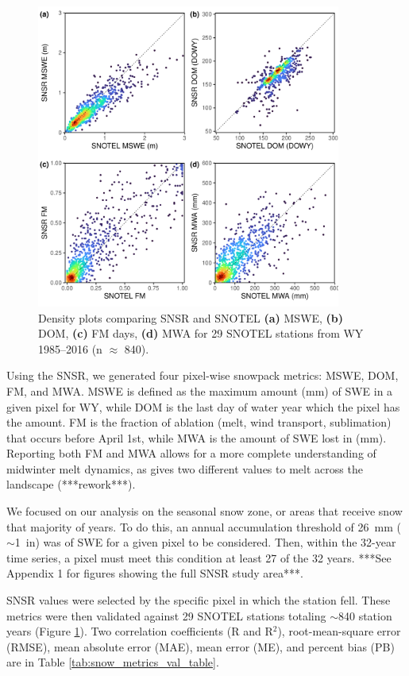 \begin{figure}[t]
\centering
\includegraphics[width=10cm]{figures/ch2_figs/snsr_snotel_metric_compare_new_v1.pdf}
\caption{Density plots comparing SNSR and SNOTEL \textbf{(a)} MSWE, \textbf{(b)} DOM, \textbf{(c)} FM days, \textbf{(d)} MWA for 29 SNOTEL stations from WY 1985--2016 (n $\approx$ 840).}
\label{kuy_study_area}
\end{figure}

Using the SNSR, we generated four pixel-wise snowpack metrics: MSWE, DOM, FM, and MWA. MSWE is defined as the maximum amount (mm) of SWE in a given pixel for WY, while DOM is the last day of water year which the pixel has the amount. FM is the fraction of ablation (melt, wind transport, sublimation) that occurs before April 1st, while MWA is the amount of SWE lost in (mm). Reporting both FM and MWA allows for a more complete understanding of midwinter melt dynamics, as gives two different values to melt across the landscape (***rework***).

We focused on our analysis on the seasonal snow zone, or areas that receive snow that majority of years. To do this, an annual accumulation threshold of 26~mm ($\sim$1~in) was of SWE for a given pixel to be considered. Then, within the 32-year time series, a pixel must meet this condition at least 27 of the 32 years. ***See Appendix 1 for figures showing the full SNSR study area***. 

SNSR values were selected by the specific pixel in which the station fell. These metrics were then validated against 29 SNOTEL stations totaling $\sim$840 station years (Figure \ref{kuy_study_area}). Two correlation coefficients (R and R$^{2}$), root-mean-square error (RMSE), mean absolute error (MAE), mean error (ME), and percent bias (PB) are in Table \ref{tab:snow_metrics_val_table}.


